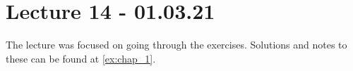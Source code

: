 
\section{Lecture 14 - 01.03.21}

The lecture was focused on going through the exercises. Solutions and notes to these can be found at \ref{ex:chap_1}. 